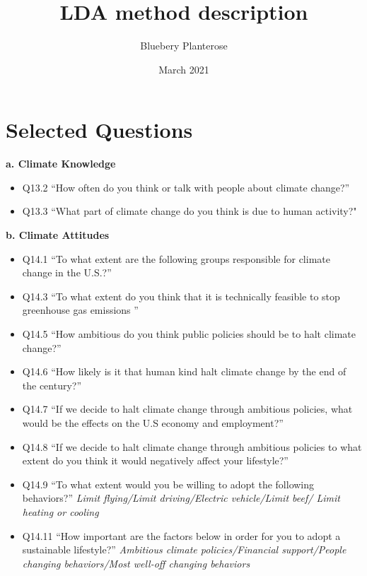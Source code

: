 \documentclass{article}
\title{LDA method description}
\author{Bluebery Planterose}
\date{March 2021}
\begin{document}
\maketitle

\section{Selected Questions}
\begin{flushleft}
\textbf{a. Climate Knowledge}
\end{flushleft}
\begin{itemize}
    \item Q13.2 ``How often do you think or talk with people about climate change?''
    \item Q13.3 ``What part of climate change do you think is due to human activity?"    
\end{itemize}

\begin{flushleft}
\textbf{b. Climate Attitudes}
\end{flushleft}

\begin{itemize}
    \item Q14.1 ``To what extent are the following groups responsible for climate change in the U.S.?''
    \item Q14.3 ``To what extent do you think that it is technically feasible to stop greenhouse gas emissions ''
    \item Q14.5 ``How ambitious do you think public policies should be to halt climate change?''
    \item Q14.6 ``How likely is it that human kind halt climate change by the end of the century?''
    \item Q14.7 ``If we decide to halt climate change through ambitious policies, what would be the effects on the U.S economy and employment?''
    \item Q14.8 ``If we decide to halt climate change through ambitious policies to what extent do you think it would negatively affect your lifestyle?''
    \item Q14.9 ``To what extent would you be willing to adopt the following behaviors?'' \textit{Limit flying/Limit driving/Electric vehicle/Limit beef/ Limit heating or cooling}
    \item Q14.11 ``How important are the factors below in order for you to adopt a sustainable lifestyle?'' \textit{Ambitious climate policies/Financial support/People changing behaviors/Most well-off changing behaviors}
\end{itemize}
\end{document}
